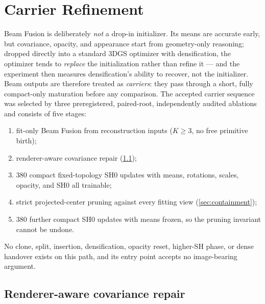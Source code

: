 \section{Carrier Refinement}
\label{sec:carrier}

Beam Fusion is deliberately \emph{not} a drop-in initializer.  Its means are accurate early,
but covariance, opacity, and appearance start from geometry-only reasoning; dropped directly
into a standard 3DGS optimizer with densification, the optimizer tends to \emph{replace}
the initialization rather than refine it --- and the experiment then measures densification's
ability to recover, not the initializer.  Beam outputs are therefore treated as
\emph{carriers}: they pass through a short, fully compact-only maturation before any
comparison.  The accepted carrier sequence was selected by three preregistered, paired-root,
independently audited ablations and consists of five stages:
\begin{enumerate}[leftmargin=1.6em,itemsep=1pt]
  \item fit-only Beam Fusion from reconstruction inputs ($K \ge 3$, no free primitive
        birth);
  \item renderer-aware covariance repair (\cref{sec:cov-repair});
  \item 380 compact fixed-topology SH0 updates with means, rotations, scales, opacity, and
        SH0 all trainable;
  \item strict projected-center pruning against every fitting view (\cref{sec:containment});
  \item 380 further compact SH0 updates with means frozen, so the pruning invariant cannot
        be undone.
\end{enumerate}
No clone, split, insertion, densification, opacity reset, higher-SH phase, or dense handover
exists on this path, and its entry point accepts no image-bearing argument.

\subsection{Renderer-aware covariance repair}
\label{sec:cov-repair}

